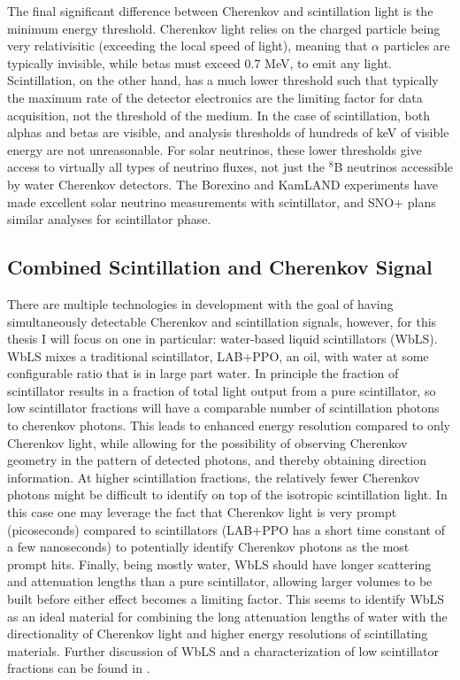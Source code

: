The final significant difference between Cherenkov and scintillation light is the minimum energy threshold.
Cherenkov light relies on the charged particle being very relativisitic (exceeding the local speed of light), meaning that $\alpha$ particles are typically invisible, while betas must exceed 0.7 MeV, to emit any light.
Scintillation, on the other hand, has a much lower threshold such that typically the maximum rate of the detector electronics are the limiting factor for data acquisition, not the threshold of the medium.
In the case of scintillation, both alphas and betas are visible, and analysis thresholds of hundreds of keV of visible energy are not unreasonable. 
For solar neutrinos, these lower thresholds give access to virtually all types of neutrino fluxes, not just the $^8$B neutrinos accessible by water Cherenkov detectors.
The Borexino \cite{borexino} and KamLAND \cite{kamland} experiments have made excellent solar neutrino measurements with scintillator, and SNO+ plans similar analyses for scintillator phase.

\subsection{Combined Scintillation and Cherenkov Signal}

There are multiple technologies in development with the goal of having simultaneously detectable Cherenkov and scintillation signals, however, for this thesis I will focus on one in particular: water-based liquid scintillators (WbLS).
WbLS mixes a traditional scintillator, LAB+PPO, an oil, with water at some configurable ratio that is in large part water.
In principle the fraction of scintillator results in a fraction of total light output from a pure scintillator, so low scintillator fractions will have a comparable number of scintillation photons to cherenkov photons. 
This leads to enhanced energy resolution compared to only Cherenkov light, while allowing for the possibility of observing Cherenkov geometry in the pattern of detected photons, and thereby obtaining direction information.
At higher scintillation fractions, the relatively fewer Cherenkov photons might be difficult to identify on top of the isotropic scintillation light.
In this case one may leverage the fact that Cherenkov light is very prompt (picoseconds) compared to scintillators (LAB+PPO has a short time constant of a few nanoseconds) to potentially identify Cherenkov photons as the most prompt hits.
Finally, being mostly water, WbLS should have longer scattering and attenuation lengths than a pure scintillator, allowing larger volumes to be built before either effect becomes a limiting factor.
This seems to identify WbLS as an ideal material for combining the long attenuation lengths of water with the directionality of Cherenkov light and higher energy resolutions of scintillating materials.
Further discussion of WbLS and a characterization of low scintillator fractions can be found in .

